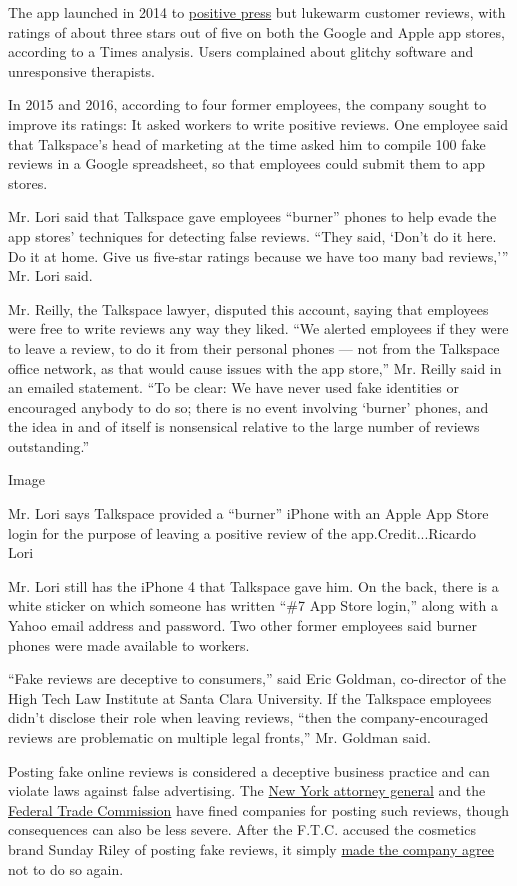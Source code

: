 The app launched in 2014 to
\href{https://www.theverge.com/2014/6/5/5765732/talkspace-smartphone-therapy-apps}{positive
press} but lukewarm customer reviews, with ratings of about three stars
out of five on both the Google and Apple app stores, according to a
Times analysis. Users complained about glitchy software and unresponsive
therapists.

In 2015 and 2016, according to four former employees, the company sought
to improve its ratings: It asked workers to write positive reviews. One
employee said that Talkspace's head of marketing at the time asked him
to compile 100 fake reviews in a Google spreadsheet, so that employees
could submit them to app stores.

Mr. Lori said that Talkspace gave employees ``burner'' phones to help
evade the app stores' techniques for detecting false reviews. ``They
said, `Don't do it here. Do it at home. Give us five-star ratings
because we have too many bad reviews,''' Mr. Lori said.

Mr. Reilly, the Talkspace lawyer, disputed this account, saying that
employees were free to write reviews any way they liked. ``We alerted
employees if they were to leave a review, to do it from their personal
phones --- not from the Talkspace office network, as that would cause
issues with the app store,'' Mr. Reilly said in an emailed statement.
``To be clear: We have never used fake identities or encouraged anybody
to do so; there is no event involving `burner' phones, and the idea in
and of itself is nonsensical relative to the large number of reviews
outstanding.''

Image

Mr. Lori says Talkspace provided a ``burner'' iPhone with an Apple App
Store login for the purpose of leaving a positive review of the
app.Credit...Ricardo Lori~

Mr. Lori still has the iPhone 4 that Talkspace gave him. On the back,
there is a white sticker on which someone has written ``\#7 App Store
login,'' along with a Yahoo email address and password. Two other former
employees said burner phones were made available to workers.

``Fake reviews are deceptive to consumers,'' said Eric Goldman,
co-director of the High Tech Law Institute at Santa Clara University. If
the Talkspace employees didn't disclose their role when leaving reviews,
``then the company-encouraged reviews are problematic on multiple legal
fronts,'' Mr. Goldman said.

Posting fake online reviews is considered a deceptive business practice
and can violate laws against false advertising. The
\href{https://ag.ny.gov/press-release/2013/ag-schneiderman-announces-agreement-19-companies-stop-writing-fake-online-reviews}{New
York attorney general} and the
\href{https://www.ftc.gov/news-events/press-releases/2019/02/ftc-brings-first-case-challenging-fake-paid-reviews-independent}{Federal
Trade Commission} have fined companies for posting such reviews, though
consequences can also be less severe. After the F.T.C. accused the
cosmetics brand Sunday Riley of posting fake reviews, it simply
\href{https://www.nytimes3xbfgragh.onion/2019/10/22/us/sunday-riley-fake-reviews.html}{made
the company agree} not to do so again.

